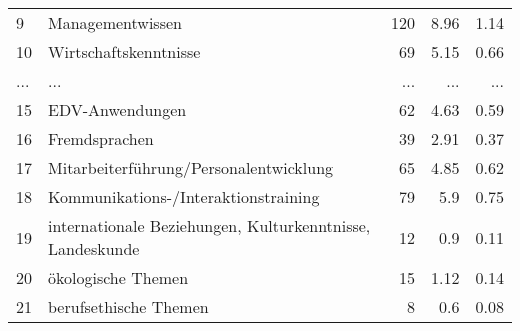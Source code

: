 \begin{longtable}{lXrrr}
        9 & \multicolumn{1}{X}{Managementwissen} & %
          \num{120} &
          \num[round-mode=places,round-precision=2]{8.96} &
          \num[round-mode=places,round-precision=2]{1.14} \\
        10 & \multicolumn{1}{X}{Wirtschaftskenntnisse} & %
          \num{69} &
          \num[round-mode=places,round-precision=2]{5.15} &
          \num[round-mode=places,round-precision=2]{0.66} \\
       ... & ... & ... & ... & ... \\
        15 & \multicolumn{1}{X}{EDV-Anwendungen} & %
          \num{62} &
          \num[round-mode=places,round-precision=2]{4.63} &
          \num[round-mode=places,round-precision=2]{0.59} \\

        16 & \multicolumn{1}{X}{Fremdsprachen} & %
          \num{39} &
          \num[round-mode=places,round-precision=2]{2.91} &
          \num[round-mode=places,round-precision=2]{0.37} \\

        17 & \multicolumn{1}{X}{Mitarbeiterführung/Personalentwicklung} & %
          \num{65} &
          \num[round-mode=places,round-precision=2]{4.85} &
          \num[round-mode=places,round-precision=2]{0.62} \\

        18 & \multicolumn{1}{X}{Kommunikations-/Interaktionstraining} & %
          \num{79} &
          \num[round-mode=places,round-precision=2]{5.9} &
          \num[round-mode=places,round-precision=2]{0.75} \\

        19 & \multicolumn{1}{X}{internationale Beziehungen, Kulturkenntnisse, Landeskunde} & %
          \num{12} &
          \num[round-mode=places,round-precision=2]{0.9} &
          \num[round-mode=places,round-precision=2]{0.11} \\

        20 & \multicolumn{1}{X}{ökologische Themen} & %
          \num{15} &
          \num[round-mode=places,round-precision=2]{1.12} &
          \num[round-mode=places,round-precision=2]{0.14} \\

        21 & \multicolumn{1}{X}{berufsethische Themen} & %
          \num{8} &
          \num[round-mode=places,round-precision=2]{0.6} &
          \num[round-mode=places,round-precision=2]{0.08} \\


\end{longtable}
